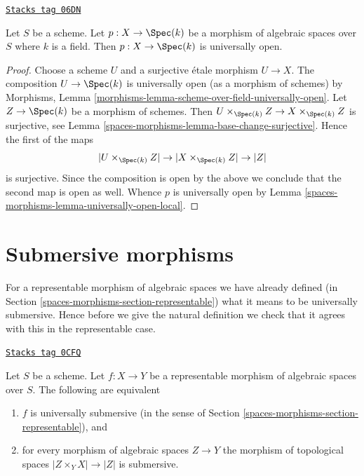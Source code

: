 \begin{lemma}
\label{spaces-morphisms-lemma-space-over-field-universally-open}
\href{https://stacks.math.columbia.edu/tag/06DN}{\texttt{Stacks tag 06DN}}

Let $S$ be a scheme. Let $p : X \to \Spec(k)$ be a morphism of
algebraic spaces over $S$ where $k$ is a field. Then
$p : X \to \Spec(k)$ is universally open.
\end{lemma}

\begin{proof}
Choose a scheme $U$ and a surjective \'etale morphism $U \to X$.
The composition $U \to \Spec(k)$ is universally open (as a morphism
of schemes) by
Morphisms, Lemma \ref{morphisms-lemma-scheme-over-field-universally-open}.
Let $Z \to \Spec(k)$ be a morphism of schemes. Then
$U \times_{\Spec(k)} Z \to X \times_{\Spec(k)} Z$ is surjective,
see
Lemma \ref{spaces-morphisms-lemma-base-change-surjective}.
Hence the first of the maps
$$
|U \times_{\Spec(k)} Z| \to |X \times_{\Spec(k)} Z| \to |Z|
$$
is surjective. Since the composition is open by the above we conclude that
the second map is open as well. Whence $p$ is universally open by
Lemma \ref{spaces-morphisms-lemma-universally-open-local}.
\end{proof}

\section{Submersive morphisms}
\label{spaces-morphisms-section-submersive}
For a representable morphism of algebraic spaces we have already defined (in
Section \ref{spaces-morphisms-section-representable})
what it means to be universally submersive. Hence before we give the natural
definition we check that it agrees with this in the representable case.

\begin{lemma}
\label{spaces-morphisms-lemma-characterize-representable-universally-submersive}
\href{https://stacks.math.columbia.edu/tag/0CFQ}{\texttt{Stacks tag 0CFQ}}

Let $S$ be a scheme. Let $f : X \to Y$ be a representable morphism of
algebraic spaces over $S$. The following are equivalent
\begin{enumerate}
\item $f$ is universally submersive
(in the sense of Section \ref{spaces-morphisms-section-representable}), and
\item for every morphism of algebraic spaces $Z \to Y$ the morphism of
topological spaces $|Z \times_Y X| \to |Z|$ is submersive.
\end{enumerate}
\end{lemma}

